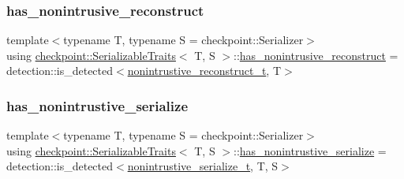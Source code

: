 \mbox{\label{structcheckpoint_1_1_serializable_traits_aeaa2e5459d2910f2ed6a8e423b45552b}} 
\subsubsection{\texorpdfstring{has\+\_\+nonintrusive\+\_\+reconstruct}{has\_nonintrusive\_reconstruct}}
{\footnotesize\ttfamily template$<$typename T, typename S = checkpoint\+::\+Serializer$>$ \\
using \hyperlink{structcheckpoint_1_1_serializable_traits}{checkpoint\+::\+Serializable\+Traits}$<$ T, S $>$\+::\hyperlink{structcheckpoint_1_1_serializable_traits_aeaa2e5459d2910f2ed6a8e423b45552b}{has\+\_\+nonintrusive\+\_\+reconstruct} =  detection\+::is\+\_\+detected$<$\hyperlink{structcheckpoint_1_1_serializable_traits_abe5231bdf561e55fd9e0673e42a8a96c}{nonintrustive\+\_\+reconstruct\+\_\+t}, T$>$}

\mbox{\label{structcheckpoint_1_1_serializable_traits_abc3628bc485acd98b08840fb99450850}} 
\subsubsection{\texorpdfstring{has\+\_\+nonintrustive\+\_\+serialize}{has\_nonintrustive\_serialize}}
{\footnotesize\ttfamily template$<$typename T, typename S = checkpoint\+::\+Serializer$>$ \\
using \hyperlink{structcheckpoint_1_1_serializable_traits}{checkpoint\+::\+Serializable\+Traits}$<$ T, S $>$\+::\hyperlink{structcheckpoint_1_1_serializable_traits_abc3628bc485acd98b08840fb99450850}{has\+\_\+nonintrustive\+\_\+serialize} =  detection\+::is\+\_\+detected$<$\hyperlink{structcheckpoint_1_1_serializable_traits_a3284d2cfd29cfe429d5cf76186d3fe3c}{nonintrustive\+\_\+serialize\+\_\+t}, T, S$>$}

